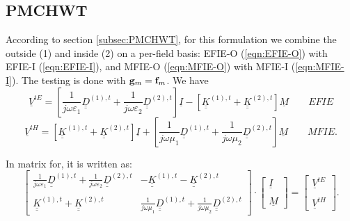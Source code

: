 \subsection{PMCHWT}
%
\par
According to section \ref{subsec:PMCHWT}, for this formulation we combine the outside (1) and inside (2) on a per-field basis: EFIE-O (\ref{eqn:EFIE-O}) with EFIE-I (\ref{eqn:EFIE-I}), and MFIE-O (\ref{eqn:MFIE-O}) with MFIE-I (\ref{eqn:MFIE-I}). The testing is done with $\mathbf{g}_m = \mathbf{f}_m$. We have
\begin{equation}\label{eqn:Matrix EFIE}
\boxed{\underline{V}^{tE} =  \left[\frac{1}{j \omega \varepsilon_1}  \underline{\underline{D}}^{(1),t} + \frac{1}{j \omega \varepsilon_2}  \underline{\underline{D}}^{(2),t}\right] \underline{I} -\left[\underline{\underline{K}}^{(1),t} + \underline{\underline{K}}^{(2),t} \right] \underline{M} } \qquad EFIE 
\end{equation}
\begin{equation}\label{eqn:Matrix MFIE}
\boxed{\underline{V}^{tH} =  \left[\underline{\underline{K}}^{(1),t} + \underline{\underline{K}}^{(2),t} \right] \underline{I} + \left[\frac{1}{j \omega \mu_1}  \underline{\underline{D}}^{(1),t} + \frac{1}{j \omega \mu_2}  \underline{\underline{D}}^{(2),t}\right] \underline{M} } \qquad MFIE.
\end{equation}
%
\par
In matrix for, it is written as:
\begin{equation}
\left[
\begin{matrix}
  \frac{1}{j \omega \varepsilon_1} \underline{\underline{D}}^{(1), t} + \frac{1}{j \omega \varepsilon_2} \underline{\underline{D}}^{(2), t} & -\underline{\underline{K}}^{(1),t} - \underline{\underline{K}}^{(2),t}  \\ \\
  \underline{\underline{K}}^{(1),t} + \underline{\underline{K}}^{(2),t} & \frac{1}{j \omega \mu_1}\underline{\underline{D}}^{(1), t} + \frac{1}{j \omega \mu_2} \underline{\underline{D}}^{(2), t}
\end{matrix}
\right]
\cdot 
\left[
\begin{matrix}
  \underline{I} \\ \\
  \underline{M}  
\end{matrix}
\right]
=
\left[
\begin{matrix}
  \underline{V}^{tE} \\ \\
  \underline{V}^{tH}
\end{matrix}
\right].
\end{equation}



